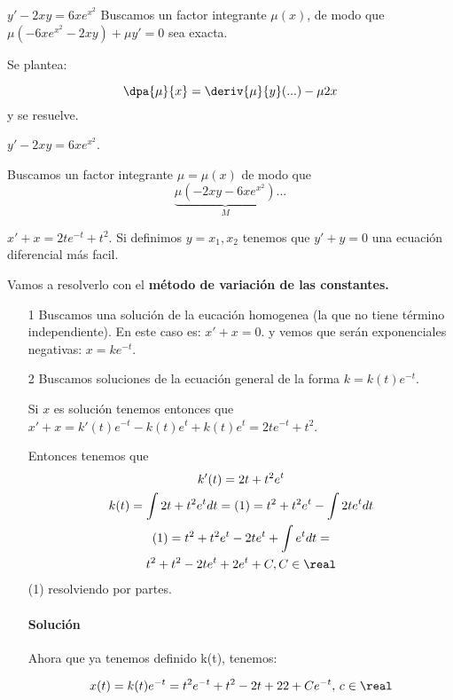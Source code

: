 \documentclass[nochap]{apuntes}
\begin{document}
\begin{problem}[nose]
$y'-2xy=6xe^{x^2}$
\solution
Buscamos un factor integrante $\mu(x)$, de modo que $\displaystyle\mu( - 6xe^{x^2} - 2xy) + \mu y' = 0 $ sea exacta.

Se plantea:

\[\dpa{\mu}{x} = \deriv{\mu}{y}(...) - \mu 2 x\]
y se resuelve.

\end{problem}

\begin{problem}[17]
\ppart
\ppart
\ppart
\ppart
\solution
\spart
\spart $y'-2xy=6xe^{x^2}$.

Buscamos un factor integrante $\mu = \mu(x)$ de modo que \[\underbrace{\mu (-2xy-6xe^{x^2})}_{M}...\]


\spart $x'+x = 2te^{-t}+t^2$. Si definimos $y = x_1,x_2$ tenemos que $y' + y=0$ una ecuación diferencial más facil.

Vamos a resolverlo con el \textbf{método de variación  de las constantes.} 

\begin{itemize}
\item[1]Buscamos una solución de la eucación homogenea (la que no tiene término independiente). En este caso es: $x'+x=0$. y vemos que serán exponenciales negativas: $x = ke^{-t}$.

\item[2] Buscamos soluciones de la ecuación general de la forma
$k=k(t)e^{-t}$.

Si $x$ es solución tenemos entonces que $x'+x = k'(t)e^{-t} - k(t)e^{t} + k(t)e^{t} = 2te^{-t}+t^2$.

Entonces tenemos que 
\begin{gather*}
k'(t) = 2t+t^2e^t\\
k(t) = \int 2t + t^2e^tdt = (1) = t^2+t^2e^t-\int 2te^tdt \\
 (1)  = t^2+t^2e^t-2te^t+\int e^tdt =\\ t^2+t^2-2te^t+2e^t+C,C\in\real\\
\end{gather*}
(1) resolviendo por partes.

\paragraph{Solución} Ahora que ya tenemos definido k(t), tenemos:

\[x(t) = k(t)e^{-t} = t^2e^{-t}+t^2-2t+22+Ce^{-t},\,c\in\real\]
\end{itemize}

\end{problem}
\end{document}

